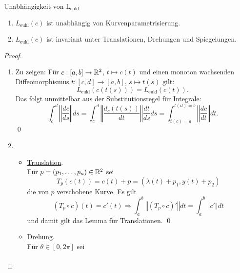 \begin{lemma}{Unabhängigkeit von $ \text{L}_\text{eukl} $}
  \label{lm:leuklinvarianz}
  \begin{enumerate}
    \item $ L_\text{eukl}(c) $ ist unabhängig von Kurvenparametrisierung.
    \item $ L_\text{eukl}(c) $ ist invariant unter Translationen, Drehungen und Spiegelungen.
  \end{enumerate}
  \begin{proof}
    \begin{enumerate}
      \item Zu zeigen: Für $ c: [a,b] \to \mathbb{R}^2 $, $ t \mapsto c(t) $ und einen monoton wachsenden Diffeomorphismus $ t: [c, d] \to [a,b] $, $ s \mapsto t(s) $ gilt:
      \begin{equation*}
        L_\text{eukl}(c(t(s))) = L_\text{eukl}(c(t))\text{.}
      \end{equation*}
      Das folgt unmittelbar aus der Substitutionsregel für Integrale:
      \begin{equation*}
        \int_c^d \left\Vert \frac{dc}{ds} \right\Vert ds = \int_c^d \left\Vert \frac{d_c(t(s))}{dt} \right\Vert \frac{dt}{ds}ds = \int_{t(c) = a}^{t(d)=b} \left\Vert \frac{dc}{dt} \right\Vert dt \text{.}
      \end{equation*}\qed
      \item \begin{itemize}
        \item \underline{Translation}. \\ Für $ p = (p_1, \dots, p_n) \in \mathbb{R}^2 $ sei
        \begin{equation*}
           T_p(c(t)) = c(t) + p = (\lambda(t) + p_1, y(t) + p_2)
         \end{equation*} 
         die von $ p $ verschobene Kurve. Es gilt
         \begin{equation*}
           (T_p \circ c)(t) = c'(t) \Rightarrow \int_a^b \left\Vert (T_p \circ c)' \right\Vert dt = \int_a^b \left\Vert c' \right\Vert dt
         \end{equation*}
         und damit gilt das Lemma für Translationen. \qed
        \item \underline{Drehung}. \\
        Für $ \theta \in [0,2\pi] $ sei
        \begin{align*}

\end{align*}
\end{itemize}
\end{enumerate}
\end{proof}
\end{lemma}
